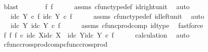 \begin{isabellebody}
\ blast\isanewline
\ \ \isamarkupfalse%
\ \isamarkupfalse%
\ {\isachardoublequoteopen}{\isachardot}{\kern0pt}{\isachardot}{\kern0pt}{\isachardot}{\kern0pt}\ {\isacharequal}{\kern0pt}\ {\isasymlangle}f{\isacharcomma}{\kern0pt}\ f{\isasymrangle}{\isachardoublequoteclose}\isanewline
\ \ \ \ \isamarkupfalse%
\ assms\ cfunc{\isacharunderscore}{\kern0pt}type{\isacharunderscore}{\kern0pt}def\ id{\isacharunderscore}{\kern0pt}right{\isacharunderscore}{\kern0pt}unit\ \isamarkupfalse%
\ auto\isanewline
\ \ \isamarkupfalse%
\ \isamarkupfalse%
\ {\isachardoublequoteopen}{\isachardot}{\kern0pt}{\isachardot}{\kern0pt}{\isachardot}{\kern0pt}\ {\isacharequal}{\kern0pt}\ {\isasymlangle}id\isactrlsub c\ Y\ {\isasymcirc}\isactrlsub c\ f{\isacharcomma}{\kern0pt}\ id\isactrlsub c\ Y\ {\isasymcirc}\isactrlsub c\ f{\isasymrangle}{\isachardoublequoteclose}\isanewline
\ \ \ \ \isamarkupfalse%
\ assms\ cfunc{\isacharunderscore}{\kern0pt}type{\isacharunderscore}{\kern0pt}def\ id{\isacharunderscore}{\kern0pt}left{\isacharunderscore}{\kern0pt}unit\ \isamarkupfalse%
\ auto\isanewline
\ \ \isamarkupfalse%
\ \isamarkupfalse%
\ {\isachardoublequoteopen}{\isachardot}{\kern0pt}{\isachardot}{\kern0pt}{\isachardot}{\kern0pt}\ {\isacharequal}{\kern0pt}\ {\isasymlangle}id\isactrlsub c\ Y{\isacharcomma}{\kern0pt}\ id\isactrlsub c\ Y{\isasymrangle}\ {\isasymcirc}\isactrlsub c\ f{\isachardoublequoteclose}\isanewline
\ \ \ \ \isamarkupfalse%
\ assms\ cfunc{\isacharunderscore}{\kern0pt}prod{\isacharunderscore}{\kern0pt}comp\ id{\isacharunderscore}{\kern0pt}type\ \isamarkupfalse%
\ fastforce\isanewline
\ \ \isamarkupfalse%
\ \isamarkupfalse%
\ {\isachardoublequoteopen}{\isacharparenleft}{\kern0pt}f\ {\isasymtimes}\isactrlsub f\ f{\isacharparenright}{\kern0pt}\ {\isasymcirc}\isactrlsub c\ {\isasymlangle}id\isactrlsub c\ X{\isacharcomma}{\kern0pt}id\isactrlsub c\ X{\isasymrangle}\ {\isacharequal}{\kern0pt}\ {\isasymlangle}id\isactrlsub c\ Y{\isacharcomma}{\kern0pt}id\isactrlsub c\ Y{\isasymrangle}\ {\isasymcirc}\isactrlsub c\ f{\isachardoublequoteclose}\isanewline
\ \ \ \ \isamarkupfalse%
\ calculation\ \isamarkupfalse%
\ auto\isanewline
{}\isamarkupfalse%
%
\endisatagproof
{\isafoldproof}%
%
\isadelimproof
\isanewline
%
\endisadelimproof
\isanewline
{}\isamarkupfalse%
\ cfunc{\isacharunderscore}{\kern0pt}cross{\isacharunderscore}{\kern0pt}prod{\isacharunderscore}{\kern0pt}comp{\isacharunderscore}{\kern0pt}cfunc{\isacharunderscore}{\kern0pt}cross{\isacharunderscore}{\kern0pt}prod{\isacharcolon}{\kern0pt}\isanewline

\end{isabellebody}
